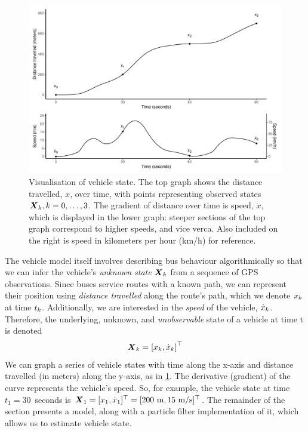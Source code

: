 \begin{knitrout}\small
{}\color{fgcolor}\begin{figure}

{\centering \includegraphics[width=\textwidth]{figure/vehicle_state-1} 

}

\caption[Visualisation of vehicle state]{Visualisation of vehicle state. The top graph shows the distance travelled, $x$, over time, with points representing observed states $\boldsymbol{X}_k, k=0,\ldots,3$. The gradient of distance over time is speed, $\dot x$, which is displayed in the lower graph: steeper sections of the top graph correspond to higher speeds, and vice verca. Also included on the right is speed in kilometers per hour (km/h) for reference.}\label{fig:vehicle_state}
\end{figure}


\end{knitrout}


The vehicle model itself involves describing bus behaviour algorithmically so that we can infer the vehicle's \emph{unknown state} $\boldsymbol{X}_k$ from a sequence of GPS observations. Since buses service routes with a known path, we can represent their position using \emph{distance travelled} along the route's path, which we denote $x_k$ at time $t_k$. Additionally, we are interested in the \emph{speed} of the vehicle, $\dot x_k$. Therefore, the underlying, unknown, and \emph{unobservable} state of a vehicle at time t is denoted
\begin{equation}
\label{eq:vehicle_state}
\boldsymbol{X}_k = \left[x_k, \dot x_k\right]^\top
\end{equation}
We can graph a series of vehicle states with time along the x-axis and distance travelled (in meters) along the y-axis, as in \cref{fig:vehicle_state}. The derivative (gradient) of the curve represents the vehicle's speed. So, for example, the vehicle state at time $t_1 = 30$~seconds is $\boldsymbol{X}_1 = [x_1, \dot x_1]^\top = [200~\text{m}, 15~\text{m/s}]^\top$. The remainder of the section presents a model, along with a particle filter implementation of it, which allows us to estimate vehicle state.

